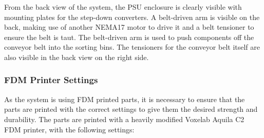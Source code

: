 From the back view of the system, the PSU enclosure is clearly visible with mounting plates for the step-down converters. A belt-driven arm is visible on the back, making use of another NEMA17 motor to drive it and a belt tensioner to ensure the belt is taut. The belt-driven arm is used to push components off the conveyor belt into the sorting bins. The tensioners for the conveyor belt itself are also visible in the back view on the right side.

\subsubsection{FDM Printer Settings}
\label{sec:3d-printer-settings}

As the system is using FDM printed parts, it is necessary to ensure that the parts are printed with the correct settings to give them the desired strength and durability. The parts are printed with a heavily modified Voxelab Aquila C2 FDM printer, with the following settings:


